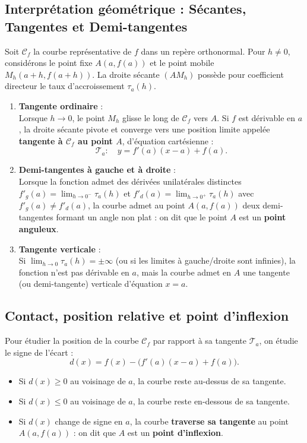 \documentclass[11pt,a4paper]{article}
\begin{document}
\subsection{Interprétation géométrique : Sécantes, Tangentes et Demi-tangentes}

Soit $\mathcal{C}_f$ la courbe représentative de $f$ dans un repère orthonormal.
Pour $h \neq 0$, considérons le point fixe $A(a, f(a))$ et le point mobile $M_h(a+h, f(a+h))$.
La droite sécante $(AM_h)$ possède pour coefficient directeur le taux d'accroissement $\tau_a(h)$.

\begin{enumerate}[label=\textbf{\arabic*.}]
    \item \textbf{Tangente ordinaire} :\\
    Lorsque $h \to 0$, le point $M_h$ glisse le long de $\mathcal{C}_f$ vers $A$. Si $f$ est dérivable en $a$, la droite sécante pivote et converge vers une position limite appelée \textbf{tangente à $\mathcal{C}_f$ au point $A$}, d'équation cartésienne :
    \[
    \mathcal{T}_a : \quad y = f'(a)(x - a) + f(a).
    \]
    \item \textbf{Demi-tangentes à gauche et à droite} :\\
    Lorsque la fonction admet des dérivées unilatérales distinctes $f'_g(a) = \lim_{h \to 0^-} \tau_a(h)$ et $f'_d(a) = \lim_{h \to 0^+} \tau_a(h)$ avec $f'_g(a) \neq f'_d(a)$, la courbe admet au point $A(a, f(a))$ deux demi-tangentes formant un angle non plat : on dit que le point $A$ est un \textbf{point anguleux}.
    \item \textbf{Tangente verticale} :\\
    Si $\lim_{h \to 0} \tau_a(h) = \pm \infty$ (ou si les limites à gauche/droite sont infinies), la fonction n'est pas dérivable en $a$, mais la courbe admet en $A$ une tangente (ou demi-tangente) verticale d'équation $x = a$.
\end{enumerate}

\subsection{Contact, position relative et point d'inflexion}

Pour étudier la position de la courbe $\mathcal{C}_f$ par rapport à sa tangente $\mathcal{T}_a$, on étudie le signe de l'écart :
\[
d(x) = f(x) - \Big( f'(a)(x - a) + f(a) \Big).
\]
\begin{itemize}
    \item Si $d(x) \ge 0$ au voisinage de $a$, la courbe reste au-dessus de sa tangente.
    \item Si $d(x) \le 0$ au voisinage de $a$, la courbe reste en-dessous de sa tangente.
    \item Si $d(x)$ change de signe en $a$, la courbe \textbf{traverse sa tangente} au point $A(a, f(a))$ : on dit que $A$ est un \textbf{point d'inflexion}.
\end{itemize}
\end{document}
